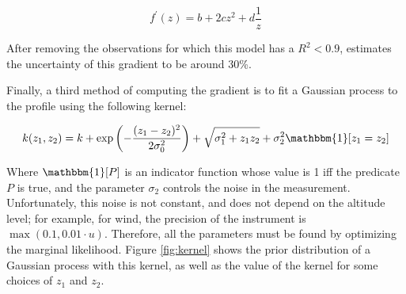 \documentclass[12pt]{book}
\begin{document}
\begin{equation}
\label{eq:log_gradient}
f^\prime(z)=b+2cz^2+d\frac{1}{z}
\end{equation}

After removing the observations for which this model has a $R^2<0.9$, \cite{windlogprofile} estimates the uncertainty of this gradient to be around 30\%.

Finally, a third method of computing the gradient is to fit a Gaussian process to the profile using the following kernel:

\begin{equation}
\label{eq:kernel}
k(z_1,z_2)=k+\exp\left(-\frac{(z_1-z_2)^2}{2\sigma_0^2}\right)+\sqrt{\sigma_1^2+ z_1 z_2}+\sigma_2^2 \mathbbm{1}[z_1=z_2]
\end{equation}

Where $\mathbbm{1}[P]$ is an indicator function whose value is 1 iff the predicate $P$ is true, and the parameter $\sigma_2$ controls the noise in the measurement. Unfortunately, this noise is not constant, and does not depend on the altitude level; for example, for wind, the precision of the instrument is $\max(0.1,0.01\cdot u)$. Therefore, all the parameters must be found by optimizing the marginal likelihood. Figure \ref{fig:kernel} shows the prior distribution of a Gaussian process with this kernel, as well as the value of the kernel for some choices of $z_1$ and $z_2$.
\end{document}
